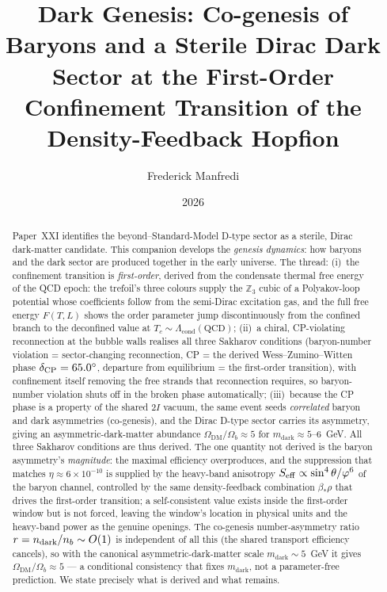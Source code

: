 \documentclass[11pt,a4paper]{article}
\title{\textbf{Dark Genesis: Co-genesis of Baryons and a Sterile Dirac Dark Sector
at the First-Order Confinement Transition of the Density-Feedback Hopfion}}
\author{Frederick Manfredi}
\date{2026}
\theoremstyle{definition}\newtheorem{definition}[theorem]{Definition}
\newcommand{\vp}{\varphi}
\newcommand{\Lcond}{\Lambda_{\mathrm{cond}}}
\newcommand{\twoI}{2I}
\newcommand{\Zthree}{\mathbb{Z}_3}
\newcommand{\Odm}{\Omega_{\mathrm{DM}}}
\newcommand{\Ob}{\Omega_{b}}
\begin{document}
\maketitle

\begin{abstract}
Paper~XXI identifies the beyond--Standard-Model D-type sector as a sterile, Dirac
dark-matter candidate. This companion develops the \emph{genesis
dynamics}: how baryons and the dark sector are produced together in the early universe.
The thread: (i)~the confinement transition is \emph{first-order}, derived from the condensate thermal free
energy of the QCD epoch: the trefoil's three colours supply the $\Zthree$ cubic of a
Polyakov-loop potential whose coefficients follow from the semi-Dirac excitation gas, and the
full free energy $F(T,L)$ shows the order parameter jump discontinuously from the confined
branch to the deconfined value at $T_c\sim\Lcond(\mathrm{QCD})$; (ii)~a chiral, CP-violating
reconnection at the bubble walls realises all three Sakharov conditions (baryon-number violation
= sector-changing reconnection, CP = the derived Wess--Zumino--Witten phase
$\delta_{\rm CP}=65.0^\circ$, departure from equilibrium = the first-order transition), with
confinement itself removing the free strands that reconnection requires, so baryon-number
violation shuts off in the broken phase automatically; (iii)~because the CP phase is a property
of the shared $\twoI$ vacuum, the same event seeds \emph{correlated} baryon and dark
asymmetries (co-genesis), and the Dirac D-type sector carries its asymmetry, giving an
asymmetric-dark-matter abundance $\Odm/\Ob\approx5$ for $m_{\mathrm{dark}}\approx5$--$6$~GeV. All
three Sakharov conditions are thus derived. The one quantity not derived is the baryon
asymmetry's \emph{magnitude}: the maximal efficiency overproduces, and the suppression that
matches $\eta\approx6\times10^{-10}$ is supplied by the heavy-band anisotropy
$S_{\rm eff}\propto\sin^4\theta/\vp^6$ of the baryon channel, controlled by the same
density-feedback combination $\beta_*\rho$ that drives the first-order transition; a
self-consistent value exists inside the first-order window but is not forced, leaving the
window's location in physical units and the heavy-band power as the genuine openings. The
co-genesis number-asymmetry ratio $r=n_{\rm dark}/n_b\sim O(1)$ is independent of all this
(the shared transport efficiency cancels), so with the canonical asymmetric-dark-matter scale
$m_{\mathrm{dark}}\sim5$~GeV it gives $\Odm/\Ob\approx5$ --- a conditional consistency that
fixes $m_{\mathrm{dark}}$, not a parameter-free prediction. We state precisely what is derived
and what remains.
\end{abstract}
\end{document}
